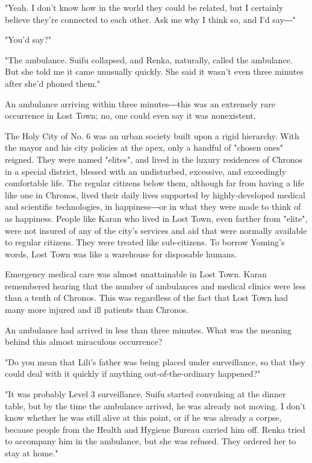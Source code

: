 "Yeah. I don't know how in the world they could be related, but I
certainly believe they're connected to each other. Ask me why I think
so, and I'd say―"

"You'd say?"

"The ambulance. Suifu collapsed, and Renka, naturally, called the
ambulance. But she told me it came unusually quickly. She said it wasn't
even three minutes after she'd phoned them."

An ambulance arriving within three minutes―this was an extremely rare
occurrence in Lost Town; no, one could even say it was nonexistent.

The Holy City of No. 6 was an urban society built upon a rigid
hierarchy. With the mayor and his city policies at the apex, only a
handful of "chosen ones" reigned. They were named "elites", and lived in
the luxury residences of Chronos in a special district, blessed with an
undisturbed, excessive, and exceedingly comfortable life. The regular
citizens below them, although far from having a life like one in
Chronos, lived their daily lives supported by highly-developed medical
and scientific technologies, in happiness―or in what they were made to
think of as happiness. People like Karan who lived in Lost Town, even
farther from "elite", were not insured of any of the city's services and
aid that were normally available to regular citizens. They were treated
like sub-citizens. To borrow Yoming's words, Lost Town was like a
warehouse for disposable humans.

Emergency medical care was almost unattainable in Lost Town. Karan
remembered hearing that the number of ambulances and medical clinics
were less than a tenth of Chronos. This was regardless of the fact that
Lost Town had many more injured and ill patients than Chronos.

An ambulance had arrived in less than three minutes. What was the
meaning behind this almost miraculous occurrence?

"Do you mean that Lili's father was being placed under surveillance, so
that they could deal with it quickly if anything out-of-the-ordinary
happened?"

"It was probably Level 3 surveillance. Suifu started convulsing at the
dinner table, but by the time the ambulance arrived, he was already not
moving. I don't know whether he was still alive at this point, or if he
was already a corpse, because people from the Health and Hygiene Bureau
carried him off. Renka tried to accompany him in the ambulance, but she
was refused. They ordered her to stay at home."

